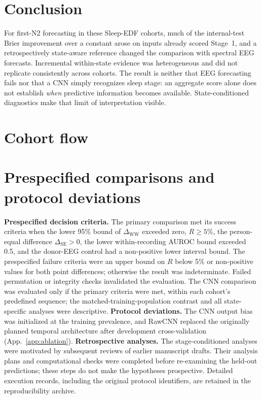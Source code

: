 \documentclass{article}
\newcommand{\R}{\ensuremath{R}}
\newcommand{\dww}{\ensuremath{\Delta_{\mathrm{WW}}}}
\newcommand{\dse}{\ensuremath{\Delta_{\mathrm{SE}}}}
\begin{document}
\section{Conclusion}
\label{sec:conclusion}

For first-N2 forecasting in these Sleep-EDF cohorts, much of the internal-test Brier improvement over a constant arose on inputs already scored Stage~1, and a retrospectively state-aware reference changed the comparison with spectral EEG forecasts. Incremental within-state evidence was heterogeneous and did not replicate consistently across cohorts. The result is neither that EEG forecasting fails nor that a CNN simply recognizes sleep stage: an aggregate score alone does not establish \emph{when} predictive information becomes available. State-conditioned diagnostics make that limit of interpretation visible.




\clearpage
\appendix

\section{Cohort flow}
\label{app:cohort}
\TableCohort

\section{Prespecified comparisons and protocol deviations}
\label{app:protocol}
\textbf{Prespecified decision criteria.} The primary comparison met its success criteria when the lower 95\% bound of $\dww$ exceeded zero, $\R\ge5\%$, the person-equal difference $\dse>0$, the lower within-recording AUROC bound exceeded 0.5, and the donor-EEG control had a non-positive lower interval bound. The prespecified failure criteria were an upper bound on $\R$ below 5\% or non-positive values for both point differences; otherwise the result was indeterminate. Failed permutation or integrity checks invalidated the evaluation. The CNN comparison was evaluated only if the primary criteria were met, within each cohort's predefined sequence; the matched-training-population contrast and all state-specific analyses were descriptive. \textbf{Protocol deviations.} The CNN output bias was initialized at the training prevalence, and RawCNN replaced the originally planned temporal architecture after development cross-validation (App.~\ref{app:ablation}). \textbf{Retrospective analyses.} The stage-conditioned analyses were motivated by subsequent reviews of earlier manuscript drafts. Their analysis plans and computational checks were completed before re-examining the held-out predictions; these steps do not make the hypotheses prospective. Detailed execution records, including the original protocol identifiers, are retained in the reproducibility archive.\par
\end{document}
